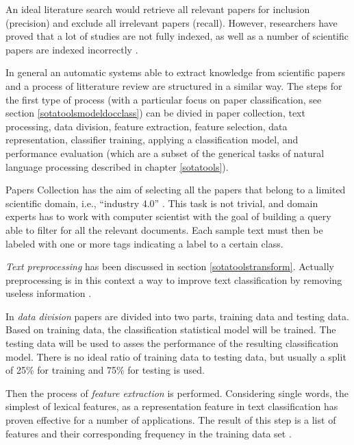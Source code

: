 \documentclass[]{book}
\theoremstyle{definition}
\theoremstyle{definition}
\theoremstyle{definition}
\theoremstyle{remark}
\begin{document}
An ideal literature search would retrieve all relevant papers for
inclusion (precision) and exclude all irrelevant papers (recall).
However, researchers have proved that a lot of studies are not fully
indexed, as well as a number of scientific papers are indexed
incorrectly
\citep{cooper1988structure, okoli2010guide, edinger2013large}.

In general an automatic systems able to extract knowledge from
scientific papers and a process of litterature review are structured in
a similar way. The steps for the first type of process (with a
particular focus on paper classification, see section
\ref{sotatoolsmodeldocclass}) can be divied in paper collection, text
processing, data division, feature extraction, feature selection, data
representation, classifier training, applying a classification model,
and performance evaluation
\citep{khorsheed2013comparative, weiss2010text, carlos2015text} (which
are a subset of the generical tasks of natural language processing
described in chapter \ref{sotatools}).

Papers Collection has the aim of selecting all the papers that belong to
a limited scientific domain, i.e., ``industry 4.0''
\citep{weiss2015fundamentals, chiarello2018extracting}. This task is not
trivial, and domain experts has to work with computer scientist with the
goal of building a query able to filter for all the relevant documents.
Each sample text must then be labeled with one or more tags indicating a
label to a certain class.

\emph{Text preprocessing} has been discussed in section
\ref{sotatoolstransform}. Actually preprocessing is in this context a
way to improve text classification by removing useless information
\citep[\citet{meyer2008text}]{weiss2010text}.

In \emph{data division} papers are divided into two parts, training data
and testing data. Based on training data, the classification statistical
model will be trained. The testing data will be used to asses the
performance of the resulting classification model. There is no ideal
ratio of training data to testing data, but usually a split of 25\% for
training and 75\% for testing is used.

Then the process of \emph{feature extraction} is performed. Considering
single words, the simplest of lexical features, as a representation
feature in text classification has proven effective for a number of
applications. The result of this step is a list of features and their
corresponding frequency in the training data set \citep{weiss2010text}.
\end{document}
